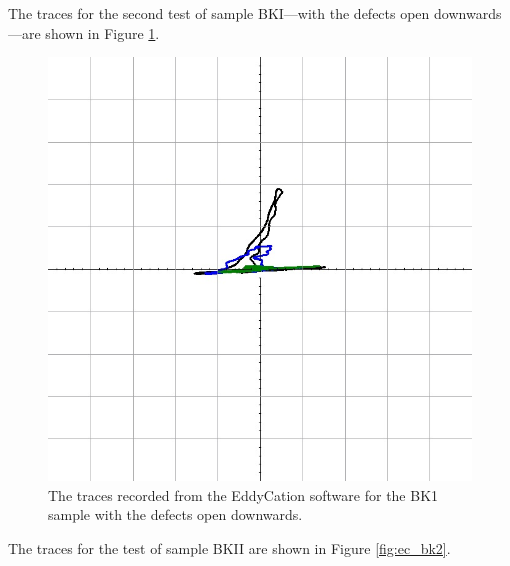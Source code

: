 \documentclass[12 pt]{report}
\begin{document}
The traces for the second test of sample BKI---with the defects open downwards---are shown in Figure \ref{fig:ec_bk1_down}.

\begin{figure}[htbp]
	\centering
	\includegraphics[width=6in]{images/graphs/eddy current testing/S4G2BK1-Downward}
	\caption{The traces recorded from the EddyCation software for the BK1 sample with the defects open downwards.}
	\label{fig:ec_bk1_down}
\end{figure}

The traces for the test of sample BKII are shown in Figure \ref{fig:ec_bk2}.
\end{document}
